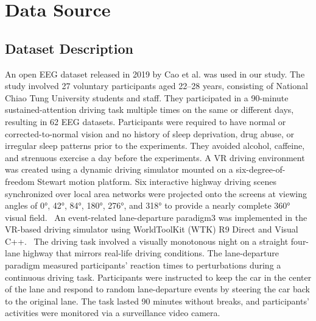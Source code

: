 \documentclass[letterpaper]{article}
\begin{document}
\bigskip


\bigskip


\bigskip


\bigskip


\bigskip


\bigskip


\bigskip


\bigskip


\bigskip


\bigskip


\bigskip


\bigskip


\bigskip


\bigskip


\bigskip


\bigskip

\section[Data Source\ \ ]{\textbf{Data Source}\textcolor[HTML]{002060}{\ \ }}
\subsection{Dataset Description}
An open EEG dataset released in 2019 by Cao et al. was used in our study. The study involved 27 voluntary participants
aged 22–28 years, consisting of National Chiao Tung University students and staff. They participated in a 90-minute
sustained-attention driving task multiple times on the same or different days, resulting in 62 EEG datasets.
Participants were required to have normal or corrected-to-normal vision and no history of sleep deprivation, drug
abuse, or irregular sleep patterns prior to the experiments. They avoided alcohol, caffeine, and strenuous exercise a
day before the experiments. A VR driving environment was created using a dynamic driving simulator mounted on a
six-degree-of-freedom Stewart motion platform. Six interactive highway driving scenes synchronized over local area
networks were projected onto the screens at viewing angles of 0°, 42°, 84°, 180°, 276°, and 318° to provide a nearly
complete 360° visual field.  An event-related lane-departure paradigm3 was implemented in the VR-based driving
simulator using WorldToolKit (WTK) R9 Direct and Visual C++.  The driving task involved a visually monotonous night on
a straight four-lane highway that mirrors real-life driving conditions. The lane-departure paradigm measured
participants' reaction times to perturbations during a continuous driving task. Participants were instructed to keep
the car in the center of the lane and respond to random lane-departure events by steering the car back to the original
lane. The task lasted 90 minutes without breaks, and participants' activities were monitored via a surveillance video
camera.
\end{document}
